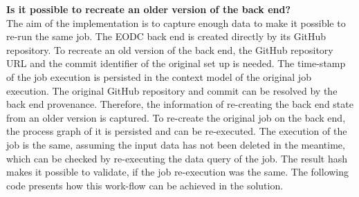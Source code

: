\documentclass[draft,final]{vutinfth} %
\begin{document}
\textbf{Is it possible to recreate an older version of the back end?} \\
The aim of the implementation is to capture enough data to make it possible to re-run the same job. The EODC back end is created directly by its GitHub repository. To recreate an old version of the back end, the GitHub repository URL and the commit identifier of the original set up is needed. The time-stamp of the job execution is persisted in the context model of the original job execution. The original GitHub repository and commit can be resolved by the back end provenance. Therefore, the information of re-creating the back end state from an older version is captured. To re-create the original job on the back end, the process graph of it is persisted and can be re-executed. The execution of the job is the same, assuming the input data has not been deleted in the meantime, which can be checked by re-executing the data query of the job. The result hash makes it possible to validate, if the job re-execution was the same. The following code presents how this work-flow can be achieved in the solution.
\end{document}
